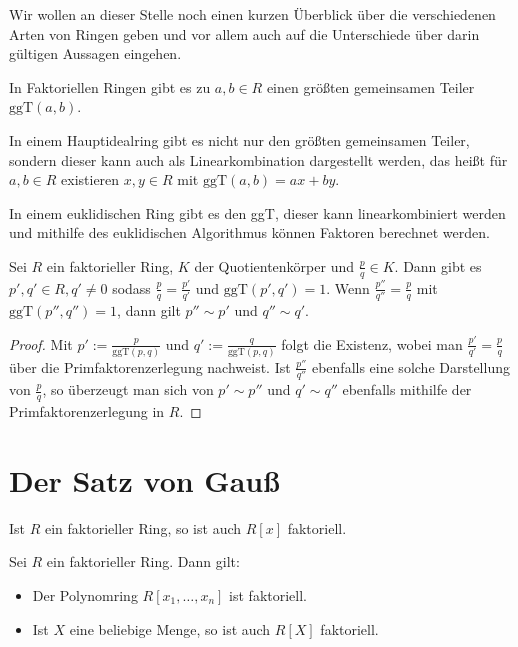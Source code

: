 \begin{remark}
    Wir wollen an dieser Stelle noch einen kurzen Überblick über die verschiedenen Arten von Ringen
    geben und vor allem auch auf die Unterschiede über darin gültigen Aussagen eingehen.

    In Faktoriellen Ringen gibt es zu $a,b\in R$ einen größten gemeinsamen Teiler $\mathrm{ggT}(a,b)$.

    In einem Hauptidealring gibt es nicht nur den größten gemeinsamen Teiler, sondern dieser kann auch als Linearkombination
    dargestellt werden, das heißt für $a,b\in R$ existieren $x,y\in R$ mit $\mathrm{ggT}(a,b)=ax+by$.

    In einem euklidischen Ring gibt es den ggT, dieser kann linearkombiniert werden und mithilfe des euklidischen Algorithmus
    können Faktoren berechnet werden.
\end{remark}

\begin{proposition}
    Sei $R$ ein faktorieller Ring, $K$ der Quotientenkörper und $\frac{p}{q}\in K$. Dann gibt es
    $p',q'\in R, q'\neq 0$ sodass $\frac{p}{q}=\frac{p'}{q'}$ und $\mathrm{ggT}(p',q')=1$. Wenn
    $\frac{p''}{q''}=\frac{p}{q}$ mit $\mathrm{ggT}(p'',q'')=1$, dann gilt $p''\sim p'$ und $q''\sim q'$.
\end{proposition}

\begin{proof}
    Mit $p':=\frac{p}{\mathrm{ggT}(p,q)}$ und $q':=\frac{q}{\mathrm{ggT}(p,q)}$ folgt die Existenz,
    wobei man $\frac{p'}{q'}=\frac{p}{q}$ über die Primfaktorenzerlegung nachweist.
    Ist $\frac{p''}{q''}$ ebenfalls eine solche Darstellung von $\frac{p}{q}$, so überzeugt man sich
    von $p'\sim p''$ und $q'\sim q''$ ebenfalls mithilfe der Primfaktorenzerlegung in $R$.
\end{proof}


\section{Der Satz von Gauß}

\begin{theorem}
    Ist $R$ ein faktorieller Ring, so ist auch $R[x]$ faktoriell.
\end{theorem}

\begin{corollary}
    Sei $R$ ein faktorieller Ring. Dann gilt:
    \begin{itemize}
        \item Der Polynomring $R[x_1, \hdots, x_n]$ ist faktoriell.
        \item Ist $X$ eine beliebige Menge, so ist auch $R[X]$ faktoriell.
    \end{itemize}
\end{corollary}

